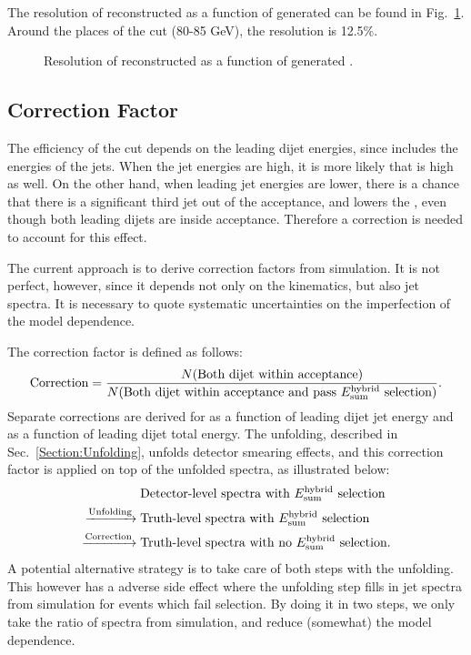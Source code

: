 The resolution of reconstructed \HybridE as a function of generated \HybridE can be found in Fig.~\ref{Figure:LeadingJet-HybridEResolution}.  Around the places of the cut (80-85 GeV), the resolution is 12.5\%.

\begin{figure}[htp!]
    \centering
    \caption{Resolution of reconstructed \HybridE as a function of generated \HybridE.}
    \label{Figure:LeadingJet-HybridEResolution}
\end{figure}

\subsection{Correction Factor}\label{Subsection:LeadingJetCorrection}

The efficiency of the cut depends on the leading dijet energies, since \HybridE includes the energies of the jets.  When the jet energies are high, it is more likely that \HybridE is high as well.  On the other hand, when leading jet energies are lower, there is a chance that there is a significant third jet out of the acceptance, and lowers the \HybridE, even though both leading dijets are inside acceptance.  Therefore a correction is needed to account for this effect.

The current approach is to derive correction factors from simulation.  It is not perfect, however, since it depends not only on the kinematics, but also jet spectra.  It is necessary to quote systematic uncertainties on the imperfection of the model dependence.

The correction factor is defined as follows:
%
\begin{align}
    \text{Correction} = \dfrac{N(\text{Both dijet within acceptance})}{N(\text{Both dijet within acceptance and pass \HybridE selection})}.
\end{align}
%
Separate corrections are derived for as a function of leading dijet jet energy and as a function of leading dijet total energy.  The unfolding, described in Sec.~\ref{Section:Unfolding}, unfolds detector smearing effects, and this correction factor is applied on top of the unfolded spectra, as illustrated below:
%
\begin{align}
    &\text{Detector-level spectra with \HybridE selection}\nonumber\\
    \xrightarrow{\text{Unfolding}}\; &\text{Truth-level spectra with \HybridE selection} \nonumber\\
    \xrightarrow{\text{Correction}}\; &\text{Truth-level spectra with no \HybridE selection}.
\end{align}
%
A potential alternative strategy is to take care of both steps with the unfolding.  This however has a adverse side effect where the unfolding step fills in jet spectra from simulation for events which fail \HybridE selection.  By doing it in two steps, we only take the ratio of spectra from simulation, and reduce (somewhat) the model dependence.

